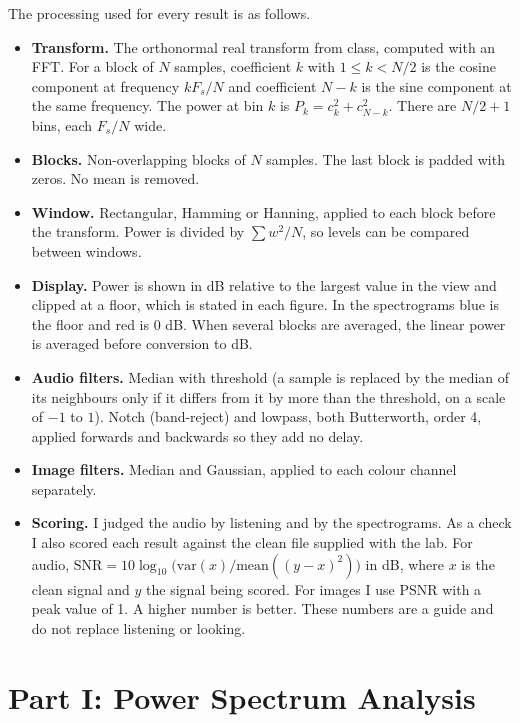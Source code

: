 \documentclass[12pt, letterpaper]{article}
\begin{document}
The processing used for every result is as follows.
\begin{itemize}
  \item \textbf{Transform.} The orthonormal real transform from class, computed with an FFT. For a block of $N$ samples, coefficient $k$ with $1 \le k < N/2$ is the cosine component at frequency $kF_s/N$ and coefficient $N-k$ is the sine component at the same frequency. The power at bin $k$ is $P_k = c_k^2 + c_{N-k}^2$. There are $N/2+1$ bins, each $F_s/N$ wide.
  \item \textbf{Blocks.} Non-overlapping blocks of $N$ samples. The last block is padded with zeros. No mean is removed.
  \item \textbf{Window.} Rectangular, Hamming or Hanning, applied to each block before the transform. Power is divided by $\sum w^2/N$, so levels can be compared between windows.
  \item \textbf{Display.} Power is shown in dB relative to the largest value in the view and clipped at a floor, which is stated in each figure. In the spectrograms blue is the floor and red is 0 dB. When several blocks are averaged, the linear power is averaged before conversion to dB.
  \item \textbf{Audio filters.} Median with threshold (a sample is replaced by the median of its neighbours only if it differs from it by more than the threshold, on a scale of $-1$ to $1$). Notch (band-reject) and lowpass, both Butterworth, order 4, applied forwards and backwards so they add no delay.
  \item \textbf{Image filters.} Median and Gaussian, applied to each colour channel separately.
  \item \textbf{Scoring.} I judged the audio by listening and by the spectrograms. As a check I also scored each result against the clean file supplied with the lab. For audio, $\mathrm{SNR} = 10\log_{10}\!\big(\mathrm{var}(x)/\mathrm{mean}((y-x)^2)\big)$ in dB, where $x$ is the clean signal and $y$ the signal being scored. For images I use PSNR with a peak value of 1. A higher number is better. These numbers are a guide and do not replace listening or looking.
\end{itemize}

\section{Part I: Power Spectrum Analysis}
\end{document}
